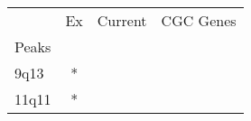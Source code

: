\begin{tabular}{lccr}
\toprule
{} & Ex & Current & CGC Genes \\
Peaks &    &         &           \\
\midrule
9q13  &  * &         &           \\
11q11 &  * &         &           \\
\bottomrule
\end{tabular}
